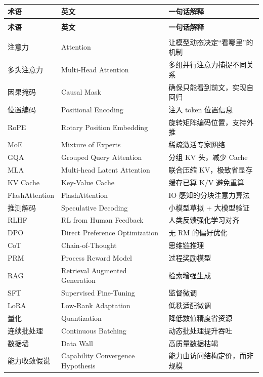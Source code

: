 \documentclass[12pt,a4paper]{article}
\begin{document}
\begin{longtable}{@{}>{\raggedright\arraybackslash}p{3.6cm}>{\raggedright\arraybackslash}p{4.6cm}p{6.8cm}@{}}
\toprule
\textbf{术语} & \textbf{英文} & \textbf{一句话解释}\\
\midrule
\endfirsthead
\multicolumn{3}{@{}l}{\small\itshape （续上页）}\\
\toprule
\textbf{术语} & \textbf{英文} & \textbf{一句话解释}\\
\midrule
\endhead
\midrule
\multicolumn{3}{r@{}}{\small\itshape （接下页）}\\
\endfoot
\bottomrule
\endlastfoot
注意力 & Attention & 让模型动态决定“看哪里”的机制\\
多头注意力 & Multi-Head Attention & 多组并行注意力捕捉不同关系\\
因果掩码 & Causal Mask & 确保只能看到前文，实现自回归\\
位置编码 & Positional Encoding & 注入 token 位置信息\\
RoPE & Rotary Position Embedding & 旋转矩阵编码位置，支持外推\\
MoE & Mixture of Experts & 稀疏激活专家网络\\
GQA & Grouped Query Attention & 分组 KV 头，减少 Cache\\
MLA & Multi-head Latent Attention & 联合压缩 KV，极致省显存\\
KV Cache & Key-Value Cache & 缓存已算 K/V 避免重算\\
FlashAttention & FlashAttention & IO 感知的分块注意力算法\\
推测解码 & Speculative Decoding & 小模型草拟 + 大模型验证\\
RLHF & RL from Human Feedback & 人类反馈强化学习对齐\\
DPO & Direct Preference Optimization & 无 RM 的偏好优化\\
CoT & Chain-of-Thought & 思维链推理\\
PRM & Process Reward Model & 过程奖励模型\\
RAG & Retrieval Augmented Generation & 检索增强生成\\
SFT & Supervised Fine-Tuning & 监督微调\\
LoRA & Low-Rank Adaptation & 低秩适配微调\\
量化 & Quantization & 降低数值精度省资源\\
连续批处理 & Continuous Batching & 动态批处理提升吞吐\\
数据墙 & Data Wall & 高质量数据枯竭\\
能力收敛假说 & Capability Convergence Hypothesis & 能力由访问结构定价，而非规模\\

\end{longtable}
\end{document}
